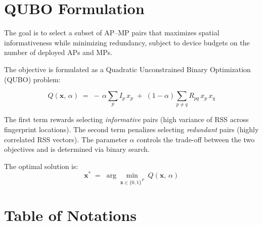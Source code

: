 \documentclass[12pt]{article}
\begin{document}
\section*{QUBO Formulation}

The goal is to select a subset of AP--MP pairs that maximizes spatial
informativeness while minimizing redundancy, subject to device budgets
on the number of deployed APs and MPs.

\medskip

The objective is formulated as a Quadratic Unconstrained Binary
Optimization (QUBO) problem:

\begin{equation}
    Q(\mathbf{x},\, \alpha)
    \;=\;
    -\,\alpha \sum_{p} I_p\, x_p
    \;+\;
    (1 - \alpha) \sum_{p \neq q} R_{pq}\, x_p\, x_q
    \label{eq:qubo}
\end{equation}

\noindent
The first term rewards selecting \emph{informative} pairs (high variance
of RSS across fingerprint locations). The second term penalizes selecting
\emph{redundant} pairs (highly correlated RSS vectors). The parameter
$\alpha$ controls the trade-off between the two objectives and is
determined via binary search.

\medskip

The optimal solution is:
\begin{equation}
    \mathbf{x}^* \;=\; \arg\min_{\mathbf{x} \in \{0,1\}^{P}}\;
    Q(\mathbf{x},\, \alpha)
\end{equation}

\section*{Table of Notations}
\end{document}
